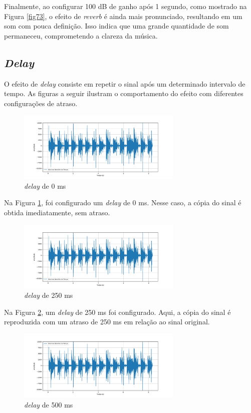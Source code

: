 Finalmente, ao configurar 100 dB de ganho após 1 segundo, como mostrado na Figura \ref{fig73}, o efeito de \textit{reverb} é ainda mais pronunciado, resultando em um som com pouca definição. Isso indica que uma grande quantidade de som permaneceu, comprometendo a clareza da música.

\subsection{\textit{Delay}}

O efeito de \textit{delay} consiste em repetir o sinal após um determinado intervalo de tempo. As figuras a seguir ilustram o comportamento do efeito com diferentes configurações de atraso.

\newpage
\begin{figure}[h]
	\centering
    \includegraphics[width=0.7\textwidth]{figuras/fig74.png}
	\caption{\textit{delay} de 0 ms}
	\label{fig74}
\end{figure}

Na Figura \ref{fig74}, foi configurado um \textit{delay} de 0 ms. Nesse caso, a cópia do sinal é obtida imediatamente, sem atraso.

\begin{figure}[h]
	\centering
    \includegraphics[width=0.7\textwidth]{figuras/fig75.png}
	\caption{\textit{delay} de 250 ms}
	\label{fig75}
\end{figure}

Na Figura \ref{fig75}, um \textit{delay} de 250 ms foi configurado. Aqui, a cópia do sinal é reproduzida com um atraso de 250 ms em relação ao sinal original.

\begin{figure}[h]
	\centering
    \includegraphics[width=0.7\textwidth]{figuras/fig76.png}
	\caption{\textit{delay} de 500 ms}
	\label{fig76}
\end{figure}

